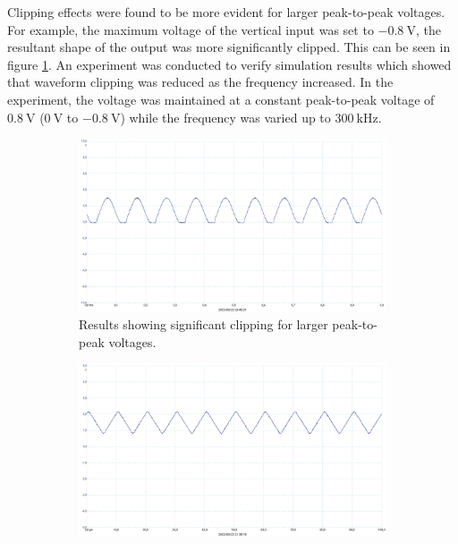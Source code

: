 \documentclass[class=report,11pt,crop=false]{standalone}
\begin{document}
	Clipping effects were found to be more evident for larger peak-to-peak voltages. For example, the maximum voltage of the vertical input was set to $-\SI{0.8}{\volt}$, the resultant shape of the output was more significantly clipped. This can be seen in figure \ref{fig:scs-output-08Vpp-10kHz}. An experiment was conducted to verify simulation results which showed that waveform clipping was reduced as the frequency increased. In the experiment, the voltage was maintained at a constant peak-to-peak voltage of $\SI{0.8}{\volt}$ ($\SI{0}{\volt}$ to $-\SI{0.8}{\volt}$) while the frequency was varied up to $\SI{300}{\kilo\hertz}$.  
	
	\begin{figure}[ht!]
		\centering
		\begin{subfigure}{.32\textwidth}
			\centering
			\includegraphics[width=0.95\linewidth]{Figures/Results/scs-output-08Vpp-10kHz}
			\caption{Results showing significant clipping for larger peak-to-peak voltages.}
			\label{fig:scs-output-08Vpp-10kHz}
		\end{subfigure}%
		\begin{subfigure}{.32\textwidth}
			\centering
			\includegraphics[width=0.95\linewidth]{Figures/Results/scs-output-08Vpp-100kHz}

\end{subfigure}
\end{figure}
\end{document}
